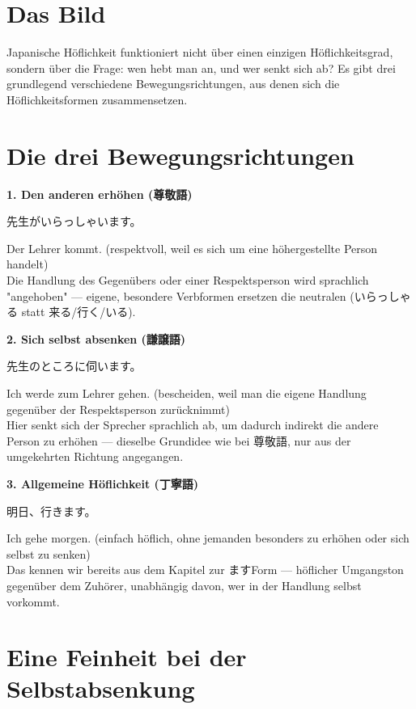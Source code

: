\documentclass[12pt]{book}
\begin{document}
\section*{Das Bild}

Japanische Höflichkeit funktioniert nicht über einen einzigen Höflichkeitsgrad, sondern über die Frage: wen hebt man an, und wer senkt sich ab? Es gibt drei grundlegend verschiedene Bewegungsrichtungen, aus denen sich die Höflichkeitsformen zusammensetzen.

\section*{Die drei Bewegungsrichtungen}

\textbf{1. Den anderen erhöhen (尊敬語)}
\par\quad 先生がいらっしゃいます。\\
\par\quad Der Lehrer kommt. (respektvoll, weil es sich um eine höhergestellte Person handelt)\\

Die Handlung des Gegenübers oder einer Respektsperson wird sprachlich "angehoben" — eigene, besondere Verbformen ersetzen die neutralen (いらっしゃる statt 来る/行く/いる).

\textbf{2. Sich selbst absenken (謙譲語)}
\par\quad 先生のところに伺います。\\
\par\quad Ich werde zum Lehrer gehen. (bescheiden, weil man die eigene Handlung gegenüber der Respektsperson zurücknimmt)\\

Hier senkt sich der Sprecher sprachlich ab, um dadurch indirekt die andere Person zu erhöhen — dieselbe Grundidee wie bei 尊敬語, nur aus der umgekehrten Richtung angegangen.

\textbf{3. Allgemeine Höflichkeit (丁寧語)}
\par\quad 明日、行きます。\\
\par\quad Ich gehe morgen. (einfach höflich, ohne jemanden besonders zu erhöhen oder sich selbst zu senken)\\

Das kennen wir bereits aus dem Kapitel zur ますForm — höflicher Umgangston gegenüber dem Zuhörer, unabhängig davon, wer in der Handlung selbst vorkommt.

\section*{Eine Feinheit bei der Selbstabsenkung}
\end{document}
